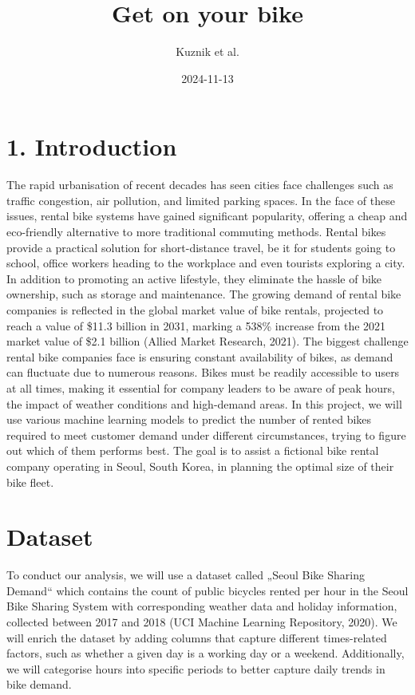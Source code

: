 \documentclass[
]{article}
\title{Get on your bike}
\author{Kuznik et al.}
\date{2024-11-13}
\begin{document}
\maketitle

\section{1. Introduction}\label{introduction}

The rapid urbanisation of recent decades has seen cities face challenges
such as traffic congestion, air pollution, and limited parking spaces.
In the face of these issues, rental bike systems have gained significant
popularity, offering a cheap and eco-friendly alternative to more
traditional commuting methods. Rental bikes provide a practical solution
for short-distance travel, be it for students going to school, office
workers heading to the workplace and even tourists exploring a city. In
addition to promoting an active lifestyle, they eliminate the hassle of
bike ownership, such as storage and maintenance. The growing demand of
rental bike companies is reflected in the global market value of bike
rentals, projected to reach a value of \$11.3 billion in 2031, marking a
538\% increase from the 2021 market value of \$2.1 billion (Allied
Market Research, 2021). The biggest challenge rental bike companies face
is ensuring constant availability of bikes, as demand can fluctuate due
to numerous reasons. Bikes must be readily accessible to users at all
times, making it essential for company leaders to be aware of peak
hours, the impact of weather conditions and high-demand areas. In this
project, we will use various machine learning models to predict the
number of rented bikes required to meet customer demand under different
circumstances, trying to figure out which of them performs best. The
goal is to assist a fictional bike rental company operating in Seoul,
South Korea, in planning the optimal size of their bike fleet.

\section{Dataset}\label{dataset}

To conduct our analysis, we will use a dataset called „Seoul Bike
Sharing Demand`` which contains the count of public bicycles rented per
hour in the Seoul Bike Sharing System with corresponding weather data
and holiday information, collected between 2017 and 2018 (UCI Machine
Learning Repository, 2020). We will enrich the dataset by adding columns
that capture different times-related factors, such as whether a given
day is a working day or a weekend. Additionally, we will categorise
hours into specific periods to better capture daily trends in bike
demand.
\end{document}
